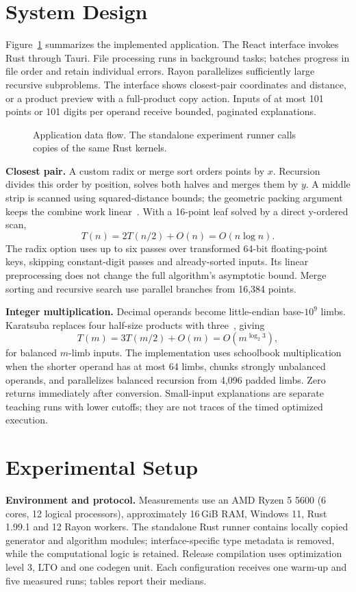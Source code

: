 \documentclass[10pt,a4paper,twocolumn]{article}
\begin{document}
\section{System Design}
Figure~\ref{fig:system} summarizes the implemented application. The React interface invokes Rust through Tauri. File processing runs in background tasks; batches progress in file order and retain individual errors. Rayon parallelizes sufficiently large recursive subproblems. The interface shows closest-pair coordinates and distance, or a product preview with a full-product copy action. Inputs of at most 101 points or 101 digits per operand receive bounded, paginated explanations.

\begin{figure}[ht]
\centering

\caption{Application data flow. The standalone experiment runner calls copies of the same Rust kernels.}
\label{fig:system}
\end{figure}

\textbf{Closest pair.} A custom radix or merge sort orders points by $x$. Recursion divides this order by position, solves both halves and merges them by $y$. A middle strip is scanned using squared-distance bounds; the geometric packing argument keeps the combine work linear~\cite{wayne2005}. With a 16-point leaf solved by a direct y-ordered scan,
\[
T(n)=2T(n/2)+O(n)=O(n\log n).
\]
The radix option uses up to six passes over transformed 64-bit floating-point keys, skipping constant-digit passes and already-sorted inputs. Its linear preprocessing does not change the full algorithm's asymptotic bound. Merge sorting and recursive search use parallel branches from 16,384 points.

\textbf{Integer multiplication.} Decimal operands become little-endian base-$10^9$ limbs. Karatsuba replaces four half-size products with three~\cite{karatsuba1962}, giving
\[
T(m)=3T(m/2)+O(m)=O(m^{\log_2 3}),
\]
for balanced $m$-limb inputs. The implementation uses schoolbook multiplication when the shorter operand has at most 64 limbs, chunks strongly unbalanced operands, and parallelizes balanced recursion from 4,096 padded limbs. Zero returns immediately after conversion. Small-input explanations are separate teaching runs with lower cutoffs; they are not traces of the timed optimized execution.


\section{Experimental Setup}
\textbf{Environment and protocol.} Measurements use an AMD Ryzen 5 5600 (6 cores, 12 logical processors), approximately 16\,GiB RAM, Windows 11, Rust 1.99.1 and 12 Rayon workers. The standalone Rust runner contains locally copied generator and algorithm modules; interface-specific type metadata is removed, while the computational logic is retained. Release compilation uses optimization level 3, LTO and one codegen unit. Each configuration receives one warm-up and five measured runs; tables report their medians.
\end{document}
